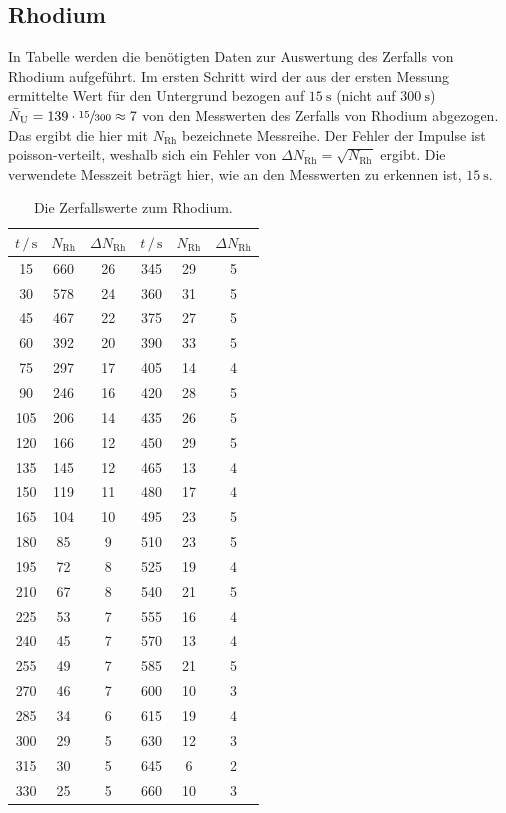 \subsection{Rhodium}

In Tabelle werden die benötigten Daten zur Auswertung des Zerfalls von Rhodium aufgeführt. 
Im ersten Schritt wird der aus der ersten Messung ermittelte Wert für den Untergrund bezogen auf $\SI{15}{\second}$ (nicht auf $\SI{300}{\second}$) $\bar{N}_\text{U}=139\cdot \sfrac{15}{300}\approx 7$ von den Messwerten des Zerfalls von Rhodium abgezogen. 
Das ergibt die hier mit $N_\text{Rh}$ bezeichnete Messreihe. 
Der Fehler der Impulse ist poisson-verteilt, weshalb sich ein Fehler von $\Delta N_\text{Rh}=\sqrt{N_\text{Rh}}$ ergibt. 
Die verwendete Messzeit beträgt hier, wie an den Messwerten zu erkennen ist, $\SI{15}{\second}$. 
\begin{table}
    \centering
    \caption{Die Zerfallswerte zum Rhodium.}
    \label{tab:MessRh}
    \begin{tabular}{S[table-format=3.0] S[table-format=3.0] S[table-format=2.0] S[table-format=3.0] S[table-format=2.0] S[table-format=1.0]}
        \toprule
        $t\,/\,\si{\second}$ & $N_\text{Rh}$ & $\Delta N_\text{Rh}$ & $t\,/\,\si{\second}$ & $N_\text{Rh}$ & $\Delta N_\text{Rh}$  \\
          & 660 & 26 & 345 & 29 & 5 \\
        30  & 578 & 24 & 360 & 31 & 5 \\
        45  & 467 & 22 & 375 & 27 & 5 \\
        60  & 392 & 20 & 390 & 33 & 5 \\
        75  & 297 & 17 & 405 & 14 & 4 \\
        90  & 246 & 16 & 420 & 28 & 5 \\
        105 & 206 & 14 & 435 & 26 & 5 \\
        120 & 166 & 12 & 450 & 29 & 5 \\
        135 & 145 & 12 & 465 & 13 & 4 \\
        150 & 119 & 11 & 480 & 17 & 4 \\
        165 & 104 & 10 & 495 & 23 & 5 \\
        180 & 85  &  9 & 510 & 23 & 5 \\
        195 & 72  &  8 & 525 & 19 & 4 \\
        210 & 67  &  8 & 540 & 21 & 5 \\
        225 & 53  &  7 & 555 & 16 & 4 \\
        240 & 45  &  7 & 570 & 13 & 4 \\
        255 & 49  &  7 & 585 & 21 & 5 \\
        270 & 46  &  7 & 600 & 10 & 3 \\
        285 & 34  &  6 & 615 & 19 & 4 \\
        300 & 29  &  5 & 630 & 12 & 3 \\
        315 & 30  &  5 & 645 &  6 & 2 \\
        330 & 25  &  5 & 660 & 10 & 3 \\
        \bottomrule
    \end{tabular}
\end{table}
